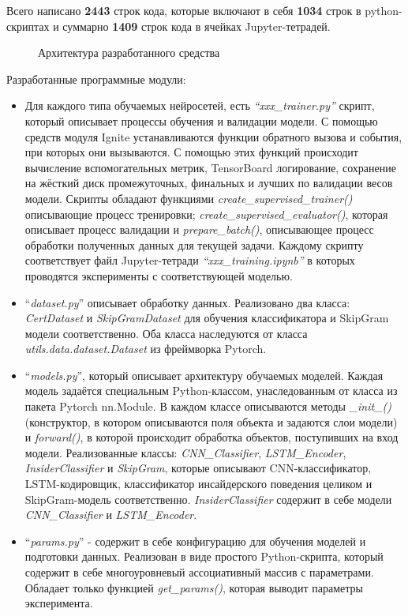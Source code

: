 Всего написано \textbf{2443} строк кода, которые включают в себя \textbf{1034} строк в python-скриптах и суммарно \textbf{1409} строк кода в ячейках Jupyter-тетрадей.\\

\begin{figure}[ht]
	\noindent{}
	\caption{Архитектура разработанного средства}
	\label{fig:architecture}
\end{figure}

Разработанные программные модули:
\begin{itemize}
\item Для каждого типа обучаемых нейросетей, есть \textit{``xxx\_trainer.py''} скрипт, который описывает процессы обучения и валидации модели. С помощью средств модуля Ignite устанавливаются функции обратного вызова и события, при которых они вызываются. С помощью этих функций происходит вычисление вспомогательных метрик, TensorBoard логирование, сохранение на жёсткий диск промежуточных, финальных и лучших по валидации весов модели. Скрипты обладают функциями \textit{create\_supervised\_trainer()} описывающие процесс тренировки; \textit{create\_supervised\_evaluator()}, которая описывает процесс валидации и \textit{prepare\_batch()}, описывающее процесс обработки полученных данных для текущей задачи. Каждому скрипту соответствует файл Jupyter-тетради \textit{``xxx\_training.ipynb''} в которых проводятся эксперименты с соответствующей моделью.
\item{``\textit{dataset.py}''} описывает обработку данных. Реализовано два класса: \textit{CertDataset} и \textit{SkipGramDataset} для обучения классификатора и SkipGram модели соответственно. Оба класса наследуются от класса \textit{utils.data.dataset.Dataset} из фреймворка Pytorch.
\item ``\textit{models.py}'', который описывает архитектуру обучаемых моделей. Каждая модель задаётся специальным Python-классом, унаследованным от класса из пакета Pytorch nn.Module. В каждом классе описываются методы \textit{\_init\_()} (конструктор, в котором описываются поля объекта и задаются слои модели) и \textit{forward()}, в которой происходит обработка объектов, поступивших на вход модели. Реализованные классы: \textit{CNN\_Classifier}, \textit{LSTM\_Encoder}, \textit{InsiderClassifier} и \textit{SkipGram}, которые описывают CNN-классификатор, LSTM-кодировщик, классификатор инсайдерского поведения целиком и SkipGram-модель соответственно. \textit{InsiderClassifier} содержит в себе модели \textit{CNN\_Classifier} и \textit{LSTM\_Encoder}.
\item ``\textit{params.py}'' - содержит в себе конфигурацию для обучения моделей и подготовки данных. Реализован в виде простого Python-скрипта, который содержит в себе многоуровневый ассоциативный массив с параметрами. Обладает только функцией \textit{get\_params()}, которая выводит параметры эксперимента.
\end{itemize}

